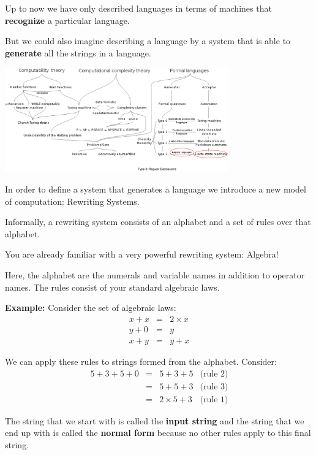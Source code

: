 \documentclass[a4paper,blends,pdf,colorBG,slideColor]{prosper}
\begin{document}
Up to now we have only described languages in terms of machines that
{\bf recognize} a particular language.  

But we could also imagine describing a language by a system that is able to
{\bf generate} all the strings in a language.

\begin{center}
    \includegraphics[height=45mm]{images/course-road-map-02.eps}
\end{center}

\es


In order to define a system that generates a language we introduce a new model
of computation: Rewriting Systems.

Informally, a rewriting system consists of an alphabet and a set of rules over that alphabet.

You are already familiar with a very powerful rewriting system: Algebra!

Here, the alphabet are the numerals and variable names in addition to operator names.
The rules consist of your standard algebraic laws.

\es


{\bf Example:} Consider the set of algebraic laws:
\begin{eqnarray}
x + x &=& 2 \times x\\
y + 0 &=& y\\
x + y &=& y + x
\end{eqnarray}

We can apply these rules to strings formed from the alphabet.  Consider:
\[
\begin{array}{rcll}
5 + 3 + 5 + 0 &=& 5 + 3 + 5 & \mbox{(rule 2)}\\
	&=& 5 + 5 + 3& \mbox{(rule 3)}\\
	&=& 2 \times 5 + 3& \mbox{(rule 1)}
\end{array}
\]

The string that we start with is called the {\bf input string} and the string that we end up with is called 
the {\bf normal form} because no other rules apply to this final string.
\end{document}
